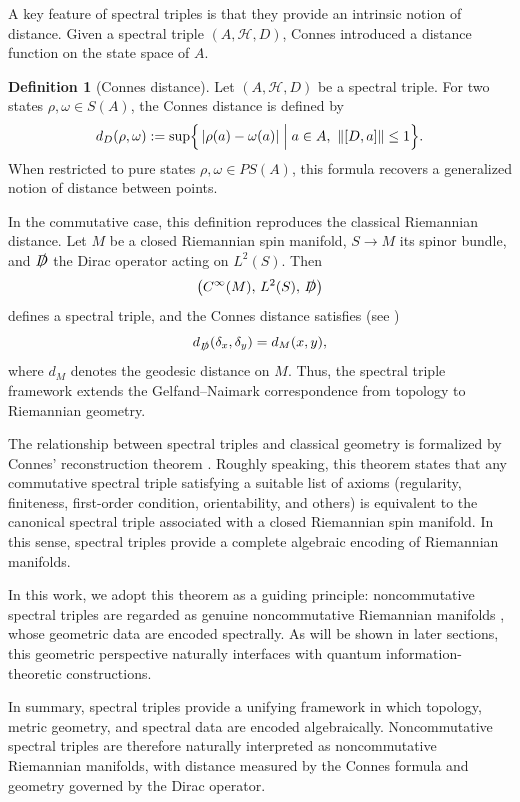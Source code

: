 \documentclass[12pt]{article}
\theoremstyle{definition} %
\newtheorem{definition}{Definition}
\theoremstyle{plain} %
\theoremstyle{remark} %
\theoremstyle{underline}
\begin{document}
\medskip

A key feature of spectral triples is that they provide an intrinsic notion of distance. Given a spectral triple $(A,\mathcal{H},D)$, Connes introduced a distance function \cite{Connes1992,connes2013spectral,Connes:1994yd} on the state space of $A$.

\begin{definition}[Connes distance]
    Let $(A,\mathcal{H},D)$ be a spectral triple. For two states $\rho,\omega\in S(A)$, the Connes distance is defined by
    \[
        d_D(\rho,\omega)
        := \sup\Bigl\{\,|\rho(a)-\omega(a)| \;\Big|\; a\in A,\ \|[D,a]\|\le 1 \Bigr\}.
    \]
    When restricted to pure states $\rho,\omega\in PS(A)$, this formula recovers a generalized notion of distance between points.
\end{definition}

In the commutative case, this definition reproduces the classical Riemannian distance. Let $M$ be a closed Riemannian spin manifold, $S\to M$ its spinor bundle, and $\slashed{D}$ the Dirac operator acting on $L^2(S)$. Then
\[
    \bigl(C^\infty(M),\, L^2(S),\, \slashed{D}\bigr)
\]
defines a spectral triple, and the Connes distance satisfies (see \cite{Landi:1997sh})
\[
    d_{\slashed{D}}(\delta_x,\delta_y)=d_M(x,y),
\]
where $d_M$ denotes the geodesic distance on $M$. Thus, the spectral triple framework extends the Gelfand--Naimark correspondence from topology to Riemannian geometry.

\medskip

The relationship between spectral triples and classical geometry is formalized by Connes' reconstruction theorem \cite{connes2013spectral}. Roughly speaking, this theorem states that any commutative spectral triple satisfying a suitable list of axioms (regularity, finiteness, first-order condition, orientability, and others) is equivalent to the canonical spectral triple associated with a closed Riemannian spin manifold. In this sense, spectral triples provide a complete algebraic encoding of Riemannian manifolds.

In this work, we adopt this theorem as a guiding principle: noncommutative spectral triples are regarded as genuine noncommutative Riemannian manifolds \cite{Connes:1994yd,connes1985non}, whose geometric data are encoded spectrally. As will be shown in later sections, this geometric perspective naturally interfaces with quantum information-theoretic constructions.

\medskip

In summary, spectral triples provide a unifying framework in which topology, metric geometry, and spectral data are encoded algebraically. Noncommutative spectral triples are therefore naturally interpreted as noncommutative Riemannian manifolds, with distance measured by the Connes formula and geometry governed by the Dirac operator.
\end{document}
